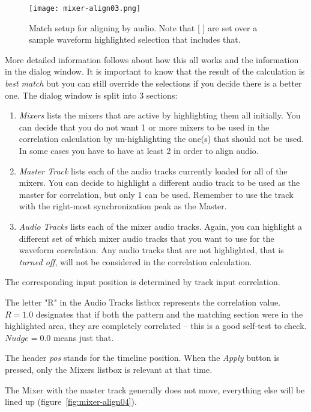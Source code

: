 \begin{figure}[htpb]
	\centering
	\texttt{[image: mixer-align03.png]}
	\caption{Match setup for aligning by audio.  Note that [ ] are set over a sample waveform highlighted selection that includes that.}
	\label{fig:mixer-align03}
\end{figure}

More detailed information follows about how this all works and the information in the dialog window.  It is important to know that the result of the calculation is \textit{best match} but you can still override the selections if you decide there is a better one.  The dialog window is split into 3 sections:

\begin{enumerate}
	\item \textit{Mixers} lists the mixers that are active by highlighting them all initially. You can decide that you do
	not want 1 or more mixers to be used in the correlation calculation by un-highlighting the one(s) that should not be used. In some cases you have to have at least 2 in order to align audio.
	\item \textit{Master Track} lists each of the audio tracks currently loaded for all of the mixers. You can decide to highlight a different audio track to be used as the master for correlation, but only 1 can be used. Remember to use the track with the right-most synchronization peak as the Master.
	\item \textit{Audio Tracks} lists each of the mixer audio tracks.  Again, you can highlight a different set of which
	mixer audio tracks that you want to use for the waveform correlation.  Any audio tracks that are not
	highlighted, that is \textit{turned off}, will not be considered in the correlation calculation.
\end{enumerate}

The corresponding input position is determined by track input correlation.

The letter "R" in the Audio Tracks listbox represents the correlation value.  $R=1.0$ designates that if both the pattern and the matching section were in the highlighted area, they are completely correlated -- this is a good self-test to check.
$Nudge=0.0$ means just that.

The header \textit{pos} stands for the timeline position. When the \textit{Apply} button is pressed, only the Mixers listbox is relevant at that time.

The Mixer with the master track generally does not move, everything else will be lined up (figure~\ref{fig:mixer-align04}).

